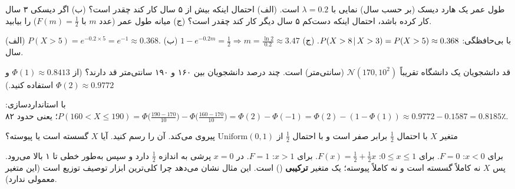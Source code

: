 \begin{exercise}
طول عمر یک هارد دیسک (بر حسب سال) نمایی با $\lambda=0.2$ است. (الف) احتمال اینکه بیش از ۵ سال کار کند چقدر است؟ (ب) اگر دیسکی ۳ سال کار کرده باشد، احتمال اینکه دست‌کم ۵ سال دیگر کار کند چقدر است؟ (ج) میانه طول عمر (عدد $m$ با $F(m)=\frac12$) را بیابید.
\end{exercise}
\begin{solution}
(الف) $P(X>5)=e^{-0.2\times5}=e^{-1}\approx0.368$.
(ب) با بی‌حافظگی: $P(X>8\,|\, X>3)=P(X>5)\approx0.368$.
(ج) $1-e^{-0.2m}=\frac12\Rightarrow m=\frac{\ln2}{0.2}\approx3.47$ سال.
\end{solution}

\begin{exercise}
قد دانشجویان یک دانشگاه تقریباً $\mathcal N(170,10^2)$ (سانتی‌متر) است. چند درصد دانشجویان بین ۱۶۰ و ۱۹۰ سانتی‌متر قد دارند؟ (از $\Phi(1)\approx0.8413$ و $\Phi(2)\approx0.9772$ استفاده کنید.)
\end{exercise}
\begin{solution}
با استانداردسازی:
$P(160<X\le190)=\Phi\big(\frac{190-170}{10}\big)-\Phi\big(\frac{160-170}{10}\big)=\Phi(2)-\Phi(-1)=\Phi(2)-(1-\Phi(1))\approx0.9772-0.1587=0.8185$؛
یعنی حدود ۸۲٪.
\end{solution}

\begin{exercise}
متغیر $X$ با احتمال $\frac12$ برابر صفر است و با احتمال $\frac12$ از $\mathrm{Uniform}(0,1)$ پیروی می‌کند.  آن را رسم کنید. آیا $X$ گسسته است یا پیوسته؟
\end{exercise}
\begin{solution}
برای $x<0$: $F=0$. برای $0\le x\le1$: $F(x)=\frac12+\frac12x$. برای $x>1$: $F=1$.  در $x=0$ پرشی به اندازه $\frac12$ دارد و سپس به‌طور خطی تا ۱ بالا می‌رود. پس $X$ نه کاملاً گسسته است و نه کاملاً پیوسته؛ یک متغیر \textbf{ترکیبی} () است. این مثال نشان می‌دهد چرا  کلی‌ترین ابزار توصیف توزیع است (این متغیر  معمولی ندارد).
\end{solution}

